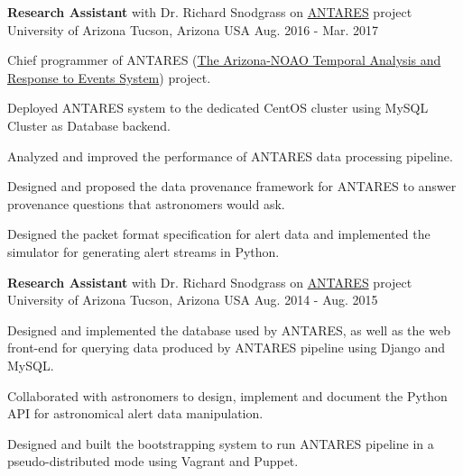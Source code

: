 

\begin{cventries}

  \cventry
    {\textbf{Research Assistant} with Dr. Richard Snodgrass on \href{https://www.noao.edu/ANTARES/}{ANTARES} project} %
    {University of Arizona} %
    {Tucson, Arizona USA} %
    {Aug. 2016 - Mar. 2017} %
    {
      \begin{cvitems} %
        \item {Chief programmer of ANTARES
    (\href{https://www.noao.edu/ANTARES/}{The Arizona-NOAO Temporal 
    Analysis and Response to Events System}) project.} 
        \item {Deployed ANTARES system to the dedicated CentOS
    cluster using MySQL Cluster as Database backend.}
        \item {Analyzed and improved the performance of ANTARES data
    processing pipeline.}
        \item {Designed and proposed the data provenance framework for
    ANTARES to answer provenance questions that astronomers would ask.}
        \item {Designed the packet format specification for alert data
        and implemented the simulator for generating alert streams in Python.}
      \end{cvitems}
    }

  \cventry
    {\textbf{Research Assistant} with Dr. Richard Snodgrass on \href{https://www.noao.edu/ANTARES/}{ANTARES} project} %
    {University of Arizona} %
    {Tucson, Arizona USA} %
    {Aug. 2014 - Aug. 2015} %
    {
      \begin{cvitems} %
        \item {Designed and implemented the database used by ANTARES,
    as well as the web front-end for querying data produced by ANTARES
    pipeline using Django and MySQL.} 
        \item {Collaborated with astronomers to design, implement
    and document the Python API for astronomical alert data manipulation.}
        \item {Designed and built the bootstrapping
    system to run ANTARES pipeline in a pseudo-distributed mode
    using Vagrant and Puppet.}
      \end{cvitems}
    }


\end{cventries}
